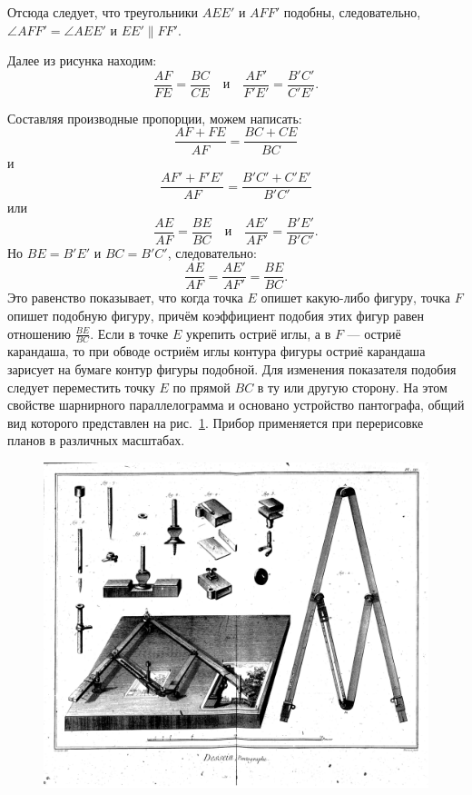 \documentclass[oneside]{book}
\begin{document}
Отсюда следует, что треугольники $AEE'$ и $AFF'$ подобны, следовательно, $\angle AFF'=\angle AEE'$ и $EE'\parallel FF'$.


Далее из рисунка находим:
\[\frac{AF}{FE}=\frac{BC}{CE}
\quad\text{и}\quad
\frac{AF'}{F'E'}=\frac{B'C'}{C'E'}.\]

Составляя производные пропорции, можем написать:
\[\frac{AF+FE}{AF}=\frac{BC+CE}{BC}\]
и
\[\frac{AF'+F'E'}{AF}=\frac{B'C'+C'E'}{B'C'}\]
или
\[\frac{AE}{AF}=\frac{BE}{BC}
\quad\text{и}\quad
\frac{AE'}{AF'}=\frac{B'E'}{B'C'}.\]
Но $BE=B'E'$ и $BC=B'C'$, следовательно:
\[\frac{AE}{AF}=\frac{AE'}{AF'}=\frac{BE}{BC}.\]
Это равенство показывает, что когда точка $E$ опишет какую-либо фигуру, точка $F$ опишет подобную фигуру, причём коэффициент подобия этих фигур равен отношению $\frac{BE}{BC}$.
Если в точке $E$ укрепить остриё иглы, а в $F$ --- остриё карандаша, то при обводе остриём иглы контура фигуры остриё карандаша зарисует на бумаге контур фигуры подобной.
Для изменения показателя подобия следует переместить точку $E$ по прямой $BC$ в ту или другую сторону.
На этом свойстве шарнирного параллелограмма и основано устройство пантографа, общий вид которого представлен на рис.~\ref{1938/ris-188}.
Прибор применяется при перерисовке планов в различных масштабах.

\begin{figure}[h]
\centering
\includegraphics[scale=.25]{jpg/1213px-Encyclopedie_volume_2b-215}
\caption{}\label{1938/ris-188}
\end{figure}
\end{document}
